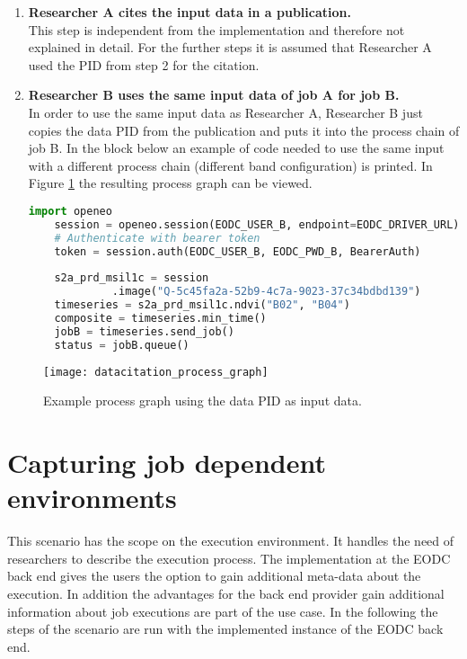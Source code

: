 \documentclass[draft,final]{vutinfth} %
\begin{document}
\begin{enumerate}
	\item \textbf{Researcher A cites the input data in a publication.} \\
	This step is independent from the implementation and therefore not explained in detail. For the further steps it is assumed that Researcher A used the PID from step 2 for the citation.   
	
	\item \textbf{Researcher B uses the same input data of job A for job B.} \\
	In order to use the same input data as Researcher A, Researcher B just copies the data PID from the publication and puts it into the process chain of job B. In the block below an example of code needed to use the same input with a different process chain (different band configuration) is printed. In Figure \ref{fig:eva_datacitation} the resulting process graph can be viewed.   
	\begin{lstlisting}[frame=single, language=Python]
	import openeo
	session = openeo.session(EODC_USER_B, endpoint=EODC_DRIVER_URL)
	# Authenticate with bearer token
	token = session.auth(EODC_USER_B, EODC_PWD_B, BearerAuth)
	
	s2a_prd_msil1c = session
		     .image("Q-5c45fa2a-52b9-4c7a-9023-37c34bdbd139")
	timeseries = s2a_prd_msil1c.ndvi("B02", "B04")
	composite = timeseries.min_time()
	jobB = timeseries.send_job()
	status = jobB.queue()
	\end{lstlisting}
	
\end{enumerate}

\begin{figure}[h]
	\centering
	\texttt{[image: datacitation\_process\_graph]}
	\caption{Example process graph using the data PID as input data.}
	\label{fig:eva_datacitation} %
\end{figure}

\section{Capturing job dependent environments}\label{Evaluation:Use Case2}
This scenario has the scope on the execution environment. It handles the need of researchers to describe the execution process. The implementation at the EODC back end gives the users the option to gain additional meta-data about the execution. In addition the advantages for the back end provider gain additional information about job executions are part of the use case. In the following the steps of the scenario are run with the implemented instance of the EODC back end.    
\end{document}
